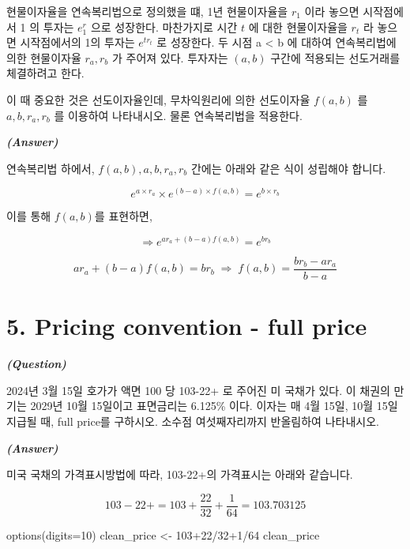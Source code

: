 \documentclass[
  letterpaper,
  DIV=11,
  numbers=noendperiod]{scrreprt}
\newenvironment{Shaded}{\begin{snugshade}}{\end{snugshade}}
\newcommand{\AttributeTok}[1]{\textcolor[rgb]{0.40,0.45,0.13}{#1}}
\newcommand{\DecValTok}[1]{\textcolor[rgb]{0.68,0.00,0.00}{#1}}
\newcommand{\FunctionTok}[1]{\textcolor[rgb]{0.28,0.35,0.67}{#1}}
\newcommand{\NormalTok}[1]{\textcolor[rgb]{0.00,0.23,0.31}{#1}}
\newcommand{\OtherTok}[1]{\textcolor[rgb]{0.00,0.23,0.31}{#1}}
\newcommand{\SpecialCharTok}[1]{\textcolor[rgb]{0.37,0.37,0.37}{#1}}
\begin{document}
현물이자율을 연속복리법으로 정의했을 떄, 1년 현물이자율을 \(r_1\) 이라
놓으면 시작점에서 1 의 투자는 \(e^r_1\) 으로 성장한다. 마찬가지로 시간
\(t\) 에 대한 현물이자율을 \(r_t\) 라 놓으면 시작점에서의 1의 투자는
\(e^{tr_t}\) 로 성장한다. 두 시점 a \textless{} b 에 대하여 연속복리법에
의한 현물이자율 \(r_a, r_b\) 가 주어져 있다. 투자자는 \((a, b)\) 구간에
적용되는 선도거래를 체결하려고 한다.

이 때 중요한 것은 선도이자율인데, 무차익원리에 의한 선도이자율
\(f(a, b)\) 를 \(a, b, r_a, r_b\) 를 이용하여 나타내시오. 물론
연속복리법을 적용한다.

\textbf{\emph{(Answer)}}

연속복리법 하에서, \(f(a, b), a, b, r_a, r_b\) 간에는 아래와 같은 식이
성립해야 합니다.

\[e^{a\times r_a}\times e^{(b-a)\times f(a,b)}=e^{b\times r_b}\]

이를 통해 \(f(a,b)\)를 표현하면,

\[\Rightarrow e^{ar_a+(b-a)f(a,b)}=e^{br_b}\]

\[ar_a+(b-a)f(a,b)=br_b\;\Rightarrow\;f(a,b)=\frac{br_b-ar_a}{b-a}\]

\section*{5. Pricing convention - full
price}\label{pricing-convention---full-price}


\textbf{\emph{(Question)}}

2024년 3월 15일 호가가 액면 100 당 103-22+ 로 주어진 미 국채가 있다. 이
채권의 만기는 2029년 10월 15일이고 표면금리는 6.125\% 이다. 이자는 매
4월 15일, 10월 15일 지급될 때, full price를 구하시오. 소수점
여섯째자리까지 반올림하여 나타내시오.

\textbf{\emph{(Answer)}}

미국 국채의 가격표시방법에 따라, 103-22+의 가격표시는 아래와 같습니다.

\[103-22+=103+\frac{22}{32}+\frac{1}{64}=103.703125\]

\begin{Shaded}
\begin{Highlighting}[]
\FunctionTok{options}\NormalTok{(}\AttributeTok{digits=}\DecValTok{10}\NormalTok{)}
\NormalTok{clean\_price }\OtherTok{\textless{}{-}} \DecValTok{103}\SpecialCharTok{+}\DecValTok{22}\SpecialCharTok{/}\DecValTok{32}\SpecialCharTok{+}\DecValTok{1}\SpecialCharTok{/}\DecValTok{64}
\NormalTok{clean\_price}
\end{Highlighting}
\end{Shaded}
\end{document}
